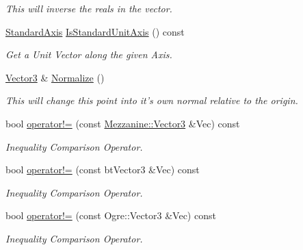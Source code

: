 \begin{DoxyCompactItemize}
\begin{DoxyCompactList}\small\item\em This will inverse the reals in the vector. \item\end{DoxyCompactList}\item 
\hyperlink{namespaceMezzanine_ab41a00a8c6a47b576dc987ec34e16ba1}{StandardAxis} \hyperlink{classMezzanine_1_1Vector3_a854b61a98d10deacdfbcfea5a2ae68d8}{IsStandardUnitAxis} () const 
\begin{DoxyCompactList}\small\item\em Get a Unit Vector along the given Axis. \item\end{DoxyCompactList}\item 
\hyperlink{classMezzanine_1_1Vector3}{Vector3} \& \hyperlink{classMezzanine_1_1Vector3_aa8705900b168f9d5234bf6de5e9564b1}{Normalize} ()
\begin{DoxyCompactList}\small\item\em This will change this point into it's own normal relative to the origin. \item\end{DoxyCompactList}\item 
bool \hyperlink{classMezzanine_1_1Vector3_ab17e377c8178ed18adf453c6f55a2471}{operator!=} (const \hyperlink{classMezzanine_1_1Vector3}{Mezzanine::Vector3} \&Vec) const 
\begin{DoxyCompactList}\small\item\em Inequality Comparison Operator. \item\end{DoxyCompactList}\item 
bool \hyperlink{classMezzanine_1_1Vector3_a5553723899629247d1fd8031ede27c31}{operator!=} (const btVector3 \&Vec) const 
\begin{DoxyCompactList}\small\item\em Inequality Comparison Operator. \item\end{DoxyCompactList}\item 
bool \hyperlink{classMezzanine_1_1Vector3_a719f34907dcd4872bde9558b9c61dc8b}{operator!=} (const Ogre::Vector3 \&Vec) const 
\begin{DoxyCompactList}\small\item\em Inequality Comparison Operator. \item\end{DoxyCompactList}\item 

\end{DoxyCompactItemize}
